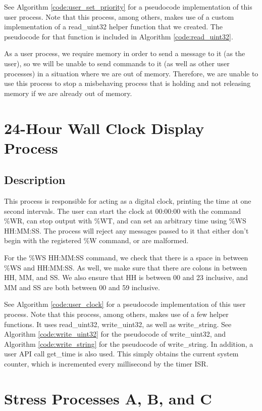 \documentclass[12pt]{report}
\begin{document}
    See Algorithm \ref{code:user_set_priority} for a pseudocode implementation
    of this user process.  Note that this process, among others, makes use of
    a custom implementation of a read\_uint32 helper function that we created.
    The pseudocode for that function is included in Algorithm
    \ref{code:read_uint32}.

    As a user process, we require memory in order to send a message to it (as
    the user), so we will be unable to send commands to it (as well as other
    user processes) in a situation where we are out of memory.  Therefore, we
    are unable to use this process to stop a misbehaving process that is holding
    and not releasing memory if we are already out of memory.

\chapter{24-Hour Wall Clock Display Process}

\section{Description}
    This process is responsible for acting as a digital clock, printing the time
    at one second intervals.  The user can start the clock at 00:00:00 with the
    command \%WR, can stop output with \%WT, and can set an arbitrary time using
    \%WS HH:MM:SS.  The process will reject any messages passed to it that
    either don't begin with the registered \%W command, or are malformed.

    For the \%WS HH:MM:SS command, we check that there is a space in between
    \%WS and HH:MM:SS.  As well, we make sure that there are colons in between
    HH, MM, and SS.  We also ensure that HH is between 00 and 23 inclusive, and
    MM and SS are both between 00 and 59 inclusive.

    See Algorithm \ref{code:user_clock} for a pseudocode implementation
    of this user process.  Note that this process, among others, makes use of
    a few helper functions.  It uses read\_uint32, write\_uint32, as well as
    write\_string.  See Algorithm \ref{code:write_uint32} for the pseudocode of
    write\_uint32, and Algorithm \ref{code:write_string} for the pseudocode of
    write\_string.  In addition, a user API call get\_time is also used.  This
    simply obtains the current system counter, which is incremented every
    millisecond by the timer ISR.

\chapter{Stress Processes A, B, and C}
\end{document}
